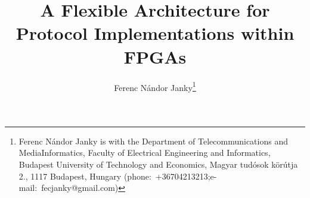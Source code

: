 \documentclass[journal]{IEEEtran}
\begin{document}
\title{A Flexible Architecture for Protocol Implementations within FPGAs}

\author{Ferenc Nándor Janky\thanks{Ferenc Nándor Janky	is with the Department of \mbox{Telecommunications} and
        \mbox{MediaInformatics},
        Faculty of Electrical Engineering and Informatics, Budapest University of Technology and \mbox{Economics},
        Magyar tudósok
        körútja 2., 1117 Budapest, Hungary (\mbox{phone: +36704213213};\mbox{e-mail:
            fecjanky@gmail.com})}%
}%

%
{}


\maketitle
\end{document}
